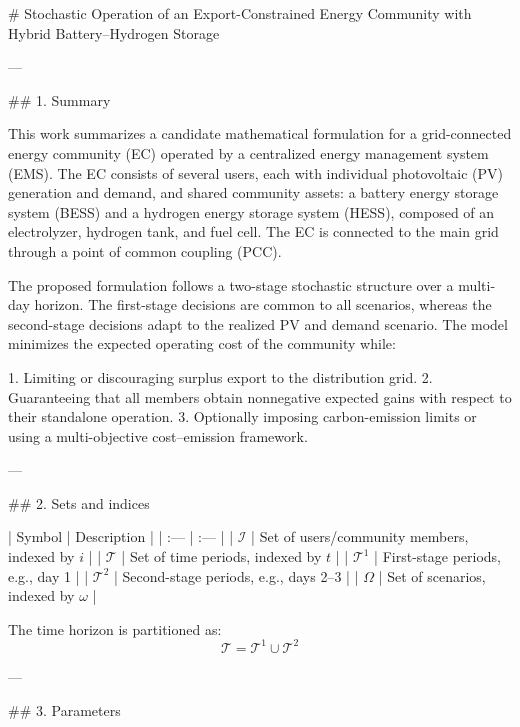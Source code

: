 # Stochastic Operation of an Export-Constrained Energy Community with Hybrid Battery--Hydrogen Storage

---

## 1. Summary

This work summarizes a candidate mathematical formulation for a grid-connected energy community (EC) operated by a centralized energy management system (EMS). The EC consists of several users, each with individual photovoltaic (PV) generation and demand, and shared community assets: a battery energy storage system (BESS) and a hydrogen energy storage system (HESS), composed of an electrolyzer, hydrogen tank, and fuel cell. The EC is connected to the main grid through a point of common coupling (PCC).

The proposed formulation follows a two-stage stochastic structure over a multi-day horizon. The first-stage decisions are common to all scenarios, whereas the second-stage decisions adapt to the realized PV and demand scenario. The model minimizes the expected operating cost of the community while:

1. Limiting or discouraging surplus export to the distribution grid.
2. Guaranteeing that all members obtain nonnegative expected gains with respect to their standalone operation.
3. Optionally imposing carbon-emission limits or using a multi-objective cost--emission framework.

---

## 2. Sets and indices

| Symbol | Description |
| :--- | :--- |
| $\mathcal{I}$ | Set of users/community members, indexed by $i$ |
| $\mathcal{T}$ | Set of time periods, indexed by $t$ |
| $\mathcal{T}^{1}$ | First-stage periods, e.g., day 1 |
| $\mathcal{T}^{2}$ | Second-stage periods, e.g., days 2--3 |
| $\Omega$ | Set of scenarios, indexed by $\omega$ |

The time horizon is partitioned as:
$$ \mathcal{T}=\mathcal{T}^{1}\cup\mathcal{T}^{2} $$

---

## 3. Parameters

